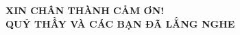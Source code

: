 \documentclass[aspectratio=169, 10pt]{beamer}
\begin{document}
\begin{frame}[plain]
  \centering
  \vspace{1.8cm}
  {\LARGE \textbf{XIN CHÂN THÀNH CẢM ƠN!}}\\[0.3cm]
  {\large \textbf{QUÝ THẦY VÀ CÁC BẠN ĐÃ LẮNG NGHE}}\\[1.0cm]
 
\end{frame}
\end{document}
